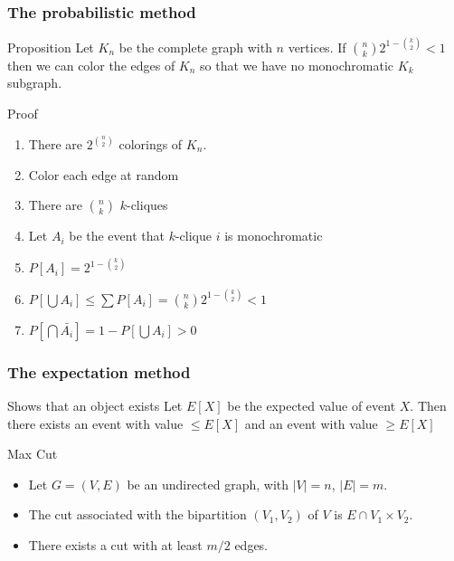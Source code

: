 \documentclass[12pt,aspectratio=169]{beamer}
\begin{document}
\begin{frame}[fragile]
\frametitle{The probabilistic method}
\begin{block}{Proposition}
  Let $K_{n}$ be the complete graph with $n$ vertices.
%
If ${n \choose k} 2^{1- {k \choose 2}} <1$ then we can color the edges of $K_{n}$ so that we
have no monochromatic $K_{k}$ subgraph.
%
\end{block}

\begin{block}{Proof}
  \begin{enumerate}
  \item
    There are $2^{n \choose 2}$ colorings of $K_{n}$.
\item
  Color each edge at random
  \item There are $n \choose k$ $k$-cliques
  \item
    Let $A_{i}$ be the event that $k$-clique $i$ is monochromatic
  \item
    $P[A_{i}] = 2^{1- {k \choose 2}}$
  \item
    $P[\bigcup A_{i}] \le \sum P[A_{i}] = {n \choose k} 2^{1- {k \choose 2}} < 1$
  \item
    $P[\bigcap \bar{A_{i}}] = 1 - P[\bigcup A_{i}] > 0$
  \end{enumerate}
\end{block}
\end{frame}

\begin{frame}[fragile]
\frametitle{The expectation method}
\begin{block}{Shows that an object exists}
  Let $E[X]$ be the expected value of event $X$.
  Then there exists an event with value $\le E[X]$ and an event with value $\ge E[X]$
\end{block}
\begin{block}{Max Cut}
  \begin{itemize}
    \item
  Let $G=(V,E)$ be an undirected graph, with $|V|=n$, $|E|=m$.
%
    \item
  The \alert{cut} associated with the bipartition $(V_{1},V_{2})$ of $V$ is $E\cap
  V_{1}\times V_{2}$.
%
    \item
  There exists a cut with at least $m/2$ edges.
%
\end{itemize}
\end{block}
\end{frame}
\end{document}
